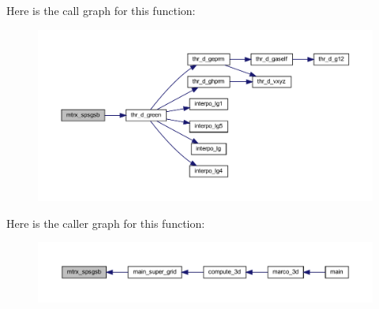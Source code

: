 Here is the call graph for this function\+:
\nopagebreak
\begin{figure}[H]
\begin{center}
\leavevmode
\includegraphics[width=350pt]{Marco_8f90_a1c4fe90d64ccbd00c0df9a4f3544a6c8_cgraph}
\end{center}
\end{figure}
Here is the caller graph for this function\+:
\nopagebreak
\begin{figure}[H]
\begin{center}
\leavevmode
\includegraphics[width=350pt]{Marco_8f90_a1c4fe90d64ccbd00c0df9a4f3544a6c8_icgraph}
\end{center}
\end{figure}
\mbox{\label{Marco_8f90_a6af8c7cf82dc910740ea6b8565200037}} 

